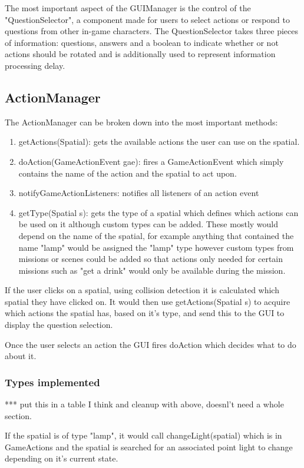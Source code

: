 The most important aspect of the GUIManager is the control of the "QuestionSelector", a component made for users to select actions or respond to questions from other in-game characters. The QuestionSelector takes three pieces of information: questions, answers and a boolean to indicate whether or not actions should be rotated and is additionally used to represent information processing delay.


\subsection{ActionManager}
The ActionManager can be broken down into the most important methods:

\begin{enumerate}
\item getActions(Spatial): gets the available actions the user can use on the spatial.
\item doAction(GameActionEvent gae): fires a GameActionEvent which simply contains the name of the action and the spatial to act upon.
\item notifyGameActionListeners: notifies all listeners of an action event
\item getType(Spatial s): gets the type of a spatial which defines which actions can be used on it although custom types can be added. These mostly would depend on the name of the spatial, for example anything that contained the name "lamp" would be assigned the "lamp" type however custom types from missions or scenes could be added so that actions only needed for certain missions such as "get a drink" would only be available during the mission.
\end{enumerate}

If the user clicks on a spatial, using collision detection it is calculated which spatial they have clicked on. It would then use getActions(Spatial s) to acquire which actions the spatial has, based on it's type, and send this to the GUI to display the question selection.

Once the user selects an action the GUI fires doAction which decides what to do about it.

\subsubsection*{Types implemented}
*** put this in a table I think and  cleanup with above, doesnl't need a whole section.

If the spatial is of type "lamp", it would call changeLight(spatial) which is in GameActions and the spatial is searched for an associated point light to change depending on it's current state. 

